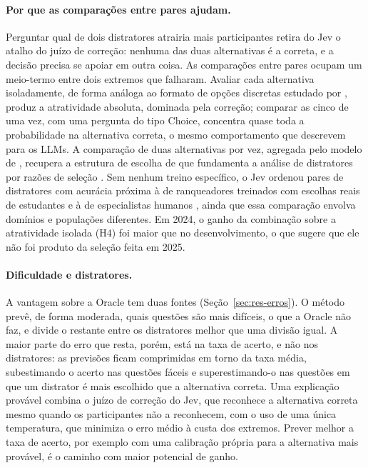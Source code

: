 \paragraph{Por que as comparações entre pares ajudam.} Perguntar qual de dois distratores atrairia mais participantes retira do Jev o atalho do juízo de correção: nenhuma das duas alternativas é a correta, e a decisão precisa se apoiar em outra coisa. As comparações entre pares ocupam um meio-termo entre dois extremos que falharam. Avaliar cada alternativa isoladamente, de forma análoga ao formato de opções discretas estudado por \citet{bolt2019}, produz a atratividade absoluta, dominada pela correção; comparar as cinco de uma vez, com uma pergunta do tipo Choice, concentra quase toda a probabilidade na alternativa correta, o mesmo comportamento que \citet{saeuberli2025} descrevem para os LLMs. A comparação de duas alternativas por vez, agregada pelo modelo de \citet{bradley1952}, recupera a estrutura de escolha de \citet{luce1959} que fundamenta a análise de distratores por razões de seleção \citep{love1997,revuelta2005}. Sem nenhum treino específico, o Jev ordenou pares de distratores com acurácia próxima à de ranqueadores treinados com escolhas reais de estudantes e à de especialistas humanos \citep{lee2025,scarlatos2024}, ainda que essa comparação envolva domínios e populações diferentes. Em 2024, o ganho da combinação sobre a atratividade isolada (H4) foi maior que no desenvolvimento, o que sugere que ele não foi produto da seleção feita em 2025.

\paragraph{Dificuldade e distratores.} A vantagem sobre a Oracle tem duas fontes (Seção~\ref{sec:res-erros}). O método prevê, de forma moderada, quais questões são mais difíceis, o que a Oracle não faz, e divide o restante entre os distratores melhor que uma divisão igual. A maior parte do erro que resta, porém, está na taxa de acerto, e não nos distratores: as previsões ficam comprimidas em torno da taxa média, subestimando o acerto nas questões fáceis e superestimando-o nas questões em que um distrator é mais escolhido que a alternativa correta. Uma explicação provável combina o juízo de correção do Jev, que reconhece a alternativa correta mesmo quando os participantes não a reconhecem, com o uso de uma única temperatura, que minimiza o erro médio à custa dos extremos. Prever melhor a taxa de acerto, por exemplo com uma calibração própria para a alternativa mais provável, é o caminho com maior potencial de ganho.

